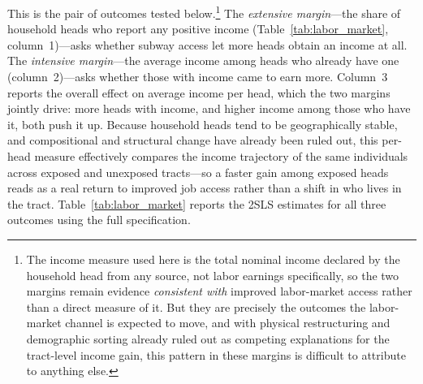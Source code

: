 This is the pair of outcomes tested below.\footnote{The income measure used here is the total nominal income declared by the household head from any source, not labor earnings specifically, so the two margins remain evidence \emph{consistent with} improved labor-market access rather than a direct measure of it. But they are precisely the outcomes the labor-market channel is expected to move, and with physical restructuring and demographic sorting already ruled out as competing explanations for the tract-level income gain, this pattern in these margins is difficult to attribute to anything else.} The \emph{extensive margin}---the share of household heads who report any positive income (Table~\ref{tab:labor_market}, column~1)---asks whether subway access let more heads obtain an income at all. The \emph{intensive margin}---the average income among heads who already have one (column~2)---asks whether those with income came to earn more. Column~3 reports the overall effect on average income per head, which the two margins jointly drive: more heads with income, and higher income among those who have it, both push it up. Because household heads tend to be geographically stable, and compositional and structural change have already been ruled out, this per-head measure effectively compares the income trajectory of the same individuals across exposed and unexposed tracts---so a faster gain among exposed heads reads as a real return to improved job access rather than a shift in who lives in the tract. Table~\ref{tab:labor_market} reports the 2SLS estimates for all three outcomes using the full specification.

